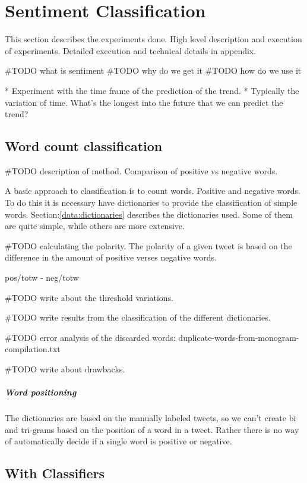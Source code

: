 
\chapter{Sentiment Classification}
This section describes the experiments done. High level description and
execution of experiments. Detailed execution and technical details in appendix. 

#TODO what is sentiment
#TODO why do we get it
#TODO how do we use it 


* Experiment with the time frame of the prediction of the trend. 
	* Typically the variation of time. What's the longest into the future that
we can predict the trend?

\section{Word count classification}
#TODO description of method. 
Comparison of positive vs negative words.

A basic approach to classification is to count words. Positive and negative
words. To do this it is necessary have dictionaries to provide the
classification of simple words. Section:\ref{data:dictionaries} describes the
dictionaries used. Some of them are quite simple, while others are more
extensive. 

#TODO calculating the polarity.  
The polarity of a given tweet is based on the difference in the amount of
positive verses negative words.

pos/totw - neg/totw 

#TODO write about the threshold variations.  

#TODO write results from the classification of the different dictionaries.

#TODO error analysis of the discarded words:
duplicate-words-from-monogram-compilation.txt

#TODO write about drawbacks.
\paragraph{Word positioning}
The dictionaries are based on the manually labeled
tweets, so we can't create bi and tri-grams based on the position of a word in a tweet.
Rather there is no way of automatically decide if a single word is positive or
negative. 

\section{With Classifiers}

